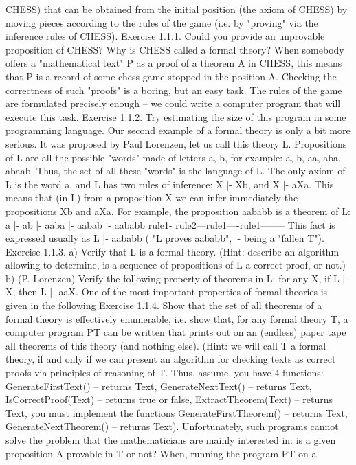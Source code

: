 CHESS) that can be obtained from the initial position (the axiom of CHESS) by moving pieces according
to the rules of the game (i.e. by "proving" via the inference rules of CHESS).
Exercise 1.1.1. Could you provide an unprovable proposition of CHESS?
Why is CHESS called a formal theory? When somebody offers a "mathematical text" P as a proof of a
theorem A in CHESS, this means that P is a record of some chess-game stopped in the position A.
Checking the correctness of such "proofs" is a boring, but an easy task. The rules of the game are
formulated precisely enough – we could write a computer program that will execute this task.
Exercise 1.1.2. Try estimating the size of this program in some programming language.
Our second example of a formal theory is only a bit more serious. It was proposed by Paul Lorenzen, let
us call this theory L. Propositions of L are all the possible "words" made of letters a, b, for example: a, b,
aa, aba, abaab. Thus, the set of all these "words" is the language of L. The only axiom of L is the word
a, and L has two rules of inference: X |- Xb, and X |- aXa. This means that (in L) from a proposition X we
can infer immediately the propositions Xb and aXa. For example, the proposition aababb is a theorem of
L:
a |- ab |- aaba |- aabab |- aababb
rule1- rule2---rule1----rule1--------
This fact is expressed usually as L |- aababb ( "L proves aababb", |- being a "fallen T").
Exercise 1.1.3. a) Verify that L is a formal theory. (Hint: describe an algorithm allowing to determine, is a
sequence of propositions of L a correct proof, or not.)
b) (P. Lorenzen) Verify the following property of theorems in L: for any X, if L |- X, then L |- aaX.
One of the most important properties of formal theories is given in the following
Exercise 1.1.4. Show that the set of all theorems of a formal theory is effectively enumerable, i.e.
show that, for any formal theory T, a computer program PT can be written that prints out on an (endless)
paper tape all theorems of this theory (and nothing else). (Hint: we will call T a formal theory, if and only
if we can present an algorithm for checking texts as correct proofs via principles of reasoning of T. Thus,
assume, you have 4 functions: GenerateFirstText() – returns Text, GenerateNextText() – returns Text,
IsCorrectProof(Text) – returns true or false, ExtractTheorem(Text) – returns Text, you must implement the
functions GenerateFirstTheorem() – returns Text, GenerateNextTheorem() – returns Text).
Unfortunately, such programs cannot solve the problem that the mathematicians are mainly
interested in: is a given proposition A provable in T or not? When, running the program PT on a
